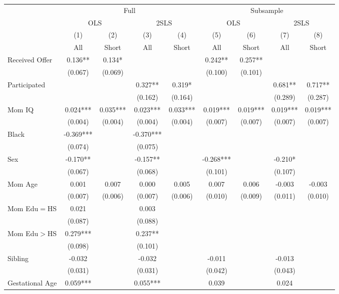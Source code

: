 \begin{tabular}{lcccccccc}
\toprule 
\midrule 
 & \multicolumn{4}{c}{Full} & \multicolumn{4}{c}{Subsample} \\
 \cmidrule(lr){2-5} \cmidrule(lr){6-9} 
 & \multicolumn{2}{c}{OLS} & \multicolumn{2}{c}{2SLS} & \multicolumn{2}{c}{OLS} & \multicolumn{2}{c}{2SLS} \\
 \cmidrule(lr){2-3} \cmidrule(lr){4-5} \cmidrule(lr){6-7} \cmidrule(lr){8-9} 
 & (1) & (2) & (3) & (4) & (5) & (6) & (7) & (8) \\
 & All & Short & All & Short & All & Short & All & Short \\
\midrule 
Received Offer & 0.136** & 0.134* &  &  & 0.242** & 0.257** &  &  \\
 & (0.067) & (0.069) &  &  & (0.100) & (0.101) &  &  \\
Participated &  &  & 0.327** & 0.319* &  &  & 0.681** & 0.717** \\
 &  &  & (0.162) & (0.164) &  &  & (0.289) & (0.287) \\
Mom IQ & 0.024*** & 0.035*** & 0.023*** & 0.033*** & 0.019*** & 0.019*** & 0.019*** & 0.019*** \\
 & (0.004) & (0.004) & (0.004) & (0.004) & (0.007) & (0.007) & (0.007) & (0.007) \\
Black & -0.369*** &  & -0.370*** &  &  &  &  &  \\
 & (0.074) &  & (0.075) &  &  &  &  &  \\
Sex & -0.170** &  & -0.157** &  & -0.268*** &  & -0.210* &  \\
 & (0.067) &  & (0.068) &  & (0.101) &  & (0.107) &  \\
Mom Age & 0.001 & 0.007 & 0.000 & 0.005 & 0.007 & 0.006 & -0.003 & -0.003 \\
 & (0.007) & (0.006) & (0.007) & (0.006) & (0.010) & (0.009) & (0.011) & (0.010) \\
Mom Edu$=$HS & 0.021 &  & 0.003 &  &  &  &  &  \\
 & (0.087) &  & (0.088) &  &  &  &  &  \\
Mom Edu$>$HS & 0.279*** &  & 0.237** &  &  &  &  &  \\
 & (0.098) &  & (0.101) &  &  &  &  &  \\
Sibling & -0.032 &  & -0.032 &  & -0.011 &  & -0.013 &  \\
 & (0.031) &  & (0.031) &  & (0.042) &  & (0.043) &  \\
Gestational Age & 0.059*** &  & 0.055*** &  & 0.039 &  & 0.024 &  \\

\end{tabular}
